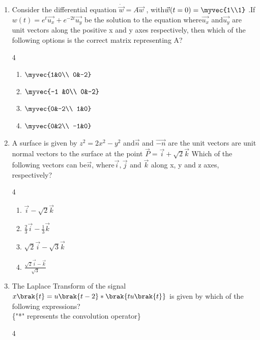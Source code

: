 \begin{enumerate}[label=\thesubsection.\arabic*,ref=\thesubsection.\theenumi]
\item Consider the differential equation $\dot{\vec {w}} = A\vec{w}$ , with$\vec{w}(t = 0)=\myvec{1\\1}$
.If
$w(t)=e^t\vec{u_x}+e^{-2t}\vec{u_y}$ be the solution to the equation where$\vec{u_x}$ and$\vec{u_y}$ are
unit vectors along the positive x and y axes respectively, then which of the
following options is the correct matrix representing A?
\begin{multicols}{4}
\begin{enumerate}
	\item $\myvec{1&0\\
		0&-2}$
	\item $\myvec{-1 &0\\
		0&-2}$
	\item $\myvec{0&-2\\
		1&0}$
	\item $\myvec{0&2\\
		-1&0}$
\end{enumerate}
\end{multicols}
\item A surface is given by $z^2=2x^2-y^2$ and$\vec{n}$ and $\vec{-n}$ are the unit vectors
are unit normal vectors to the surface at the point $\vec{P}=\vec{i}+\sqrt{2}\vec{k}$
Which of the following vectors can be$\vec{n}$, where$\vec{i},\vec{j}$ and $\vec{k}$
along x, y and z axes, respectively?
\begin{multicols}{4}
	\begin{enumerate}
		\item $\vec{i}-\sqrt{2}\vec{k}$
		\item $\frac{2}{3}\vec{i}-\frac{1}{3}\vec{k}$
		\item $\sqrt{2}\vec{i}-\sqrt{3}\vec{k}$
		\item $\frac{\sqrt{2}\vec{i}-\vec{k}}{\sqrt{3}}$
	\end{enumerate}
\end{multicols}
\item The Laplace Transform of the signal$ x\brak{t}=u\brak{t-2}*\brak{tu\brak{t}}$ is given by
which of the following expressions?\\
\{"*" represents the convolution operator\}
\begin{multicols}{4}

\end{multicols}
\end{enumerate}
